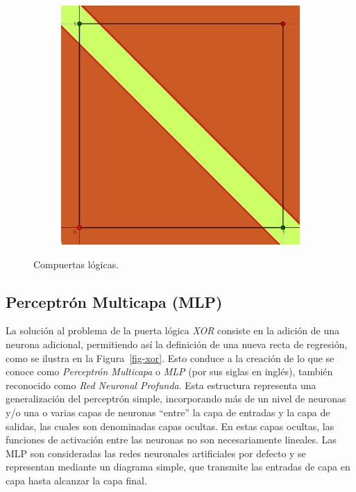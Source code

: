 \documentclass[
  us-letterpaper,
]{scrreprt}
\theoremstyle{plain}
\theoremstyle{definition}
\theoremstyle{definition}
\theoremstyle{plain}
\theoremstyle{remark}
\begin{document}
\begin{figure}
\begin{minipage}{0.33\linewidth}
{\begin{figure}[H]
{\centering \includegraphics{Imagenes/XOR.png}

}


\end{figure}%

}

\subcaption{\label{fig-xor}}

\end{minipage}%

\caption{\label{fig-compuertas}Compuertas lógicas.}

\end{figure}%

\subsection{Perceptrón Multicapa (MLP)}\label{sec-arqmlp}

La solución al problema de la puerta lógica \emph{XOR} consiste en la
adición de una neurona adicional, permitiendo así la definición de una
nueva recta de regresión, como se ilustra en la Figura~\ref{fig-xor}.
Esto conduce a la creación de lo que se conoce como \emph{Perceptrón
Multicapa} o \emph{MLP} (por sus siglas en inglés), también reconocido
como \emph{Red Neuronal Profunda}. Esta estructura representa una
generalización del perceptrón simple, incorporando más de un nivel de
neuronas y/o una o varias capas de neuronas ``entre'' la capa de
entradas y la capa de salidas, las cuales son denominadas capas ocultas.
En estas capas ocultas, las funciones de activación entre las neuronas
no son necesariamente lineales. Las MLP son consideradas las redes
neuronales artificiales por defecto y se representan mediante un
diagrama simple, que transmite las entradas de capa en capa hasta
alcanzar la capa final.
\end{document}
